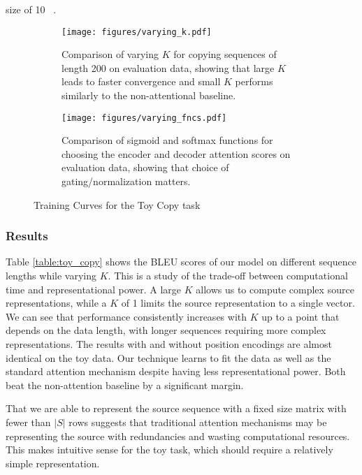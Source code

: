 \documentclass[11pt,letterpaper]{article}
\begin{document}
\noindent
size of 10 ~\cite{Wiseman:2016}.
 
\begin{figure*}[ht]
\begin{subfigure}[t]{0.49\textwidth}
    \centering
    \texttt{[image: figures/varying\_k.pdf]}
    \caption{Comparison of varying $K$ for copying sequences of length 200 on evaluation data, showing that large $K$ leads to faster convergence and small $K$ performs similarly to the non-attentional baseline.}
    \label{fig:learning_toy_200}
\end{subfigure}\hfill
\begin{subfigure}[t]{0.49\textwidth}
    \centering
    \texttt{[image: figures/varying\_fncs.pdf]}
    \caption{Comparison of sigmoid and softmax functions for choosing the encoder and decoder attention scores on evaluation data, showing that choice of gating/normalization matters.}
    \label{fig:learning_toy_sigsoft}
\end{subfigure}
\caption{Training Curves for the Toy Copy task}
\label{fig:learning_toy}
\end{figure*}

\subsubsection{Results}

Table \ref{table:toy_copy} shows the  BLEU scores of our model on different sequence lengths while varying $K$. This is a study of the trade-off between computational time and representational power. A large $K$ allows us to compute complex source representations, while a $K$ of 1 limits the source representation to a single vector. We can see that performance consistently increases with $K$ up to a point that depends on the data length, with longer sequences requiring more complex representations. The results with and without position encodings are almost identical on the toy data. Our technique learns to fit the data as well as the standard attention mechanism despite having less representational power. Both beat the non-attention baseline by a significant margin.

That we are able to represent the source sequence with a fixed size matrix with fewer than $|S|$ rows suggests that traditional attention mechanisms may be representing the source with redundancies and wasting computational resources. This makes intuitive sense for the toy task, which should require a relatively simple representation.
\end{document}
